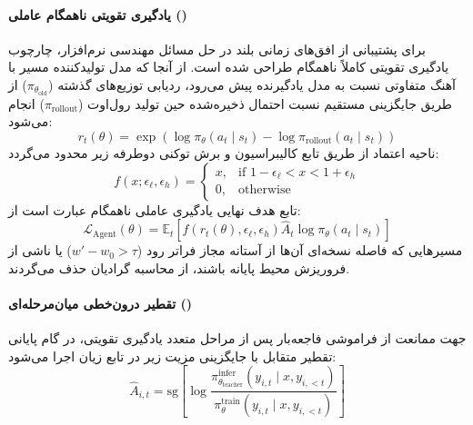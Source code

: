 \paragraph*{یادگیری تقویتی ناهمگام عاملی ()}
برای پشتیبانی از افق‌های زمانی بلند در حل مسائل مهندسی نرم‌افزار، چارچوب یادگیری تقویتی کاملاً ناهمگام طراحی شده است. از آنجا که مدل تولیدکننده مسیر با آهنگ متفاوتی نسبت به مدل یادگیرنده پیش می‌رود، ردیابی توزیع‌های گذشته ($\pi_{\theta_{\text{old}}}$) از طریق جایگزینی مستقیم نسبت احتمال ذخیره‌شده حین تولید رول‌اوت ($\pi_{\text{rollout}}$) انجام می‌شود:
\begin{equation}
    r_t(\theta) = \exp\left( \log \pi_\theta(a_t \mid s_t) - \log \pi_{\text{rollout}}(a_t \mid s_t) \right)
\end{equation}
ناحیه اعتماد از طریق تابع کالیبراسیون و برش توکنی دوطرفه زیر محدود می‌گردد:
\begin{equation}
    f(x; \epsilon_\ell, \epsilon_h) = \begin{cases} 
        x, & \text{if } 1 - \epsilon_\ell < x < 1 + \epsilon_h \\ 
        0, & \text{otherwise} 
    \end{cases}
\end{equation}
تابع هدف نهایی یادگیری عاملی ناهمگام عبارت است از:
\begin{equation}
    \mathcal{L}_{\text{Agent}}(\theta) = \mathbb{E}_t \left[ f(r_t(\theta), \epsilon_\ell, \epsilon_h) \hat{A}_t \log \pi_\theta(a_t \mid s_t) \right]
\end{equation}
مسیرهایی که فاصله نسخه‌ای آن‌ها از آستانه مجاز فراتر رود ($w' - w_0 > \tau$) یا ناشی از فروریزش محیط پایانه باشند، از محاسبه گرادیان حذف می‌گردند.

\paragraph*{تقطیر درون‌خطی میان‌مرحله‌ای ()}
جهت ممانعت از فراموشی فاجعه‌بار پس از مراحل متعدد یادگیری تقویتی، در گام پایانی تقطیر متقابل با جایگزینی مزیت زیر در تابع زیان اجرا می‌شود:
\begin{equation}
    \hat{A}_{i,t} = \text{sg}\left[ \log \frac{\pi_{\theta_{\text{teacher}}}^{\text{infer}}(y_{i,t} \mid x, y_{i,<t})}{\pi_\theta^{\text{train}}(y_{i,t} \mid x, y_{i,<t})} \right]
\end{equation}

